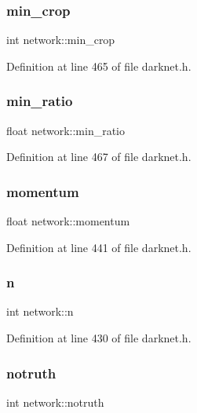 \subsubsection{\texorpdfstring{min\_crop}{min\_crop}}
{\footnotesize\ttfamily int network\+::min\+\_\+crop}



Definition at line 465 of file darknet.\+h.

\mbox{\label{structnetwork_a395ccde63912c9272f91ee6c9af14784}} 
\subsubsection{\texorpdfstring{min\_ratio}{min\_ratio}}
{\footnotesize\ttfamily float network\+::min\+\_\+ratio}



Definition at line 467 of file darknet.\+h.

\mbox{\label{structnetwork_a495c60ef821ca0ade1c42907c8bc90bf}} 
\subsubsection{\texorpdfstring{momentum}{momentum}}
{\footnotesize\ttfamily float network\+::momentum}



Definition at line 441 of file darknet.\+h.

\mbox{\label{structnetwork_a1c7625720955322d05924a075d013877}} 
\subsubsection{\texorpdfstring{n}{n}}
{\footnotesize\ttfamily int network\+::n}



Definition at line 430 of file darknet.\+h.

\mbox{\label{structnetwork_a6769bc5e23225cecf0a46eedba29719a}} 
\subsubsection{\texorpdfstring{notruth}{notruth}}
{\footnotesize\ttfamily int network\+::notruth}



